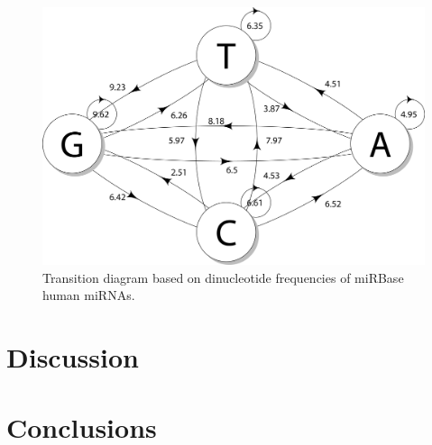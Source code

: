 \documentclass{article}
\begin{document}
\begin{figure}[h]
   \centering
   \includegraphics[width=\textwidth,natwidth=3297,natheight=2227]{image/transition.png}
   \caption{Transition diagram based on dinucleotide frequencies of miRBase human miRNAs.}
   \label{fig:transition}
\end{figure}

\section{Discussion}\label{discussion}

\section{Conclusions}\label{conclusion}



\end{document}
